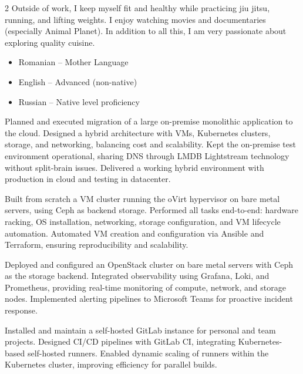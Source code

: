 \documentclass[10pt,a4paper,ragged2e,withhyper]{altacv}
\begin{document}
\begin{paracol}{2}
Outside of work, I keep myself fit and healthy while practicing jiu jitsu, running, and lifting weights. I enjoy watching movies and documentaries (especially Animal Planet). In addition to all this, I am very passionate about exploring quality cuisine.

{\small
\begin{itemize}
  \item Romanian – Mother Language
  \item English – Advanced (non-native)
  \item Russian – Native level proficiency
\end{itemize}
}


\end{paracol}
\newpage

Planned and executed migration of a large on-premise monolithic application to the cloud. Designed a hybrid architecture with VMs, Kubernetes clusters, storage, and networking, balancing cost and scalability. Kept the on-premise test environment operational, sharing DNS through LMDB Lightstream technology without split-brain issues. Delivered a working hybrid environment with production in cloud and testing in datacenter.


Built from scratch a VM cluster running the oVirt hypervisor on bare metal servers, using Ceph as backend storage. Performed all tasks end-to-end: hardware racking, OS installation, networking, storage configuration, and VM lifecycle automation. Automated VM creation and configuration via Ansible and Terraform, ensuring reproducibility and scalability.


Deployed and configured an OpenStack cluster on bare metal servers with Ceph as the storage backend. Integrated observability using Grafana, Loki, and Prometheus, providing real-time monitoring of compute, network, and storage nodes. Implemented alerting pipelines to Microsoft Teams for proactive incident response.


Installed and maintain a self-hosted GitLab instance for personal and team projects. Designed CI/CD pipelines with GitLab CI, integrating Kubernetes-based self-hosted runners. Enabled dynamic scaling of runners within the Kubernetes cluster, improving efficiency for parallel builds.
\end{document}
